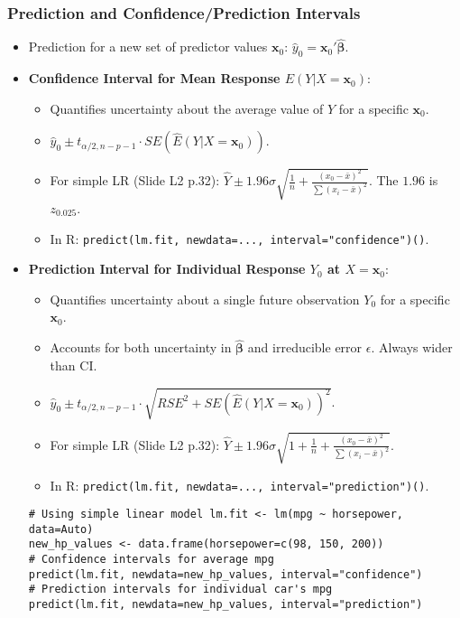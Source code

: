 \documentclass[12pt,a4paper]{article}
\newcommand{\Rfunction}[1]{\texttt{#1()}} %
\begin{document}
\begin{itemize}
    \subsubsection{Prediction and Confidence/Prediction Intervals }
        \begin{itemize}
            \item Prediction for a new set of predictor values $\mathbf{x}_0$: $\hat{y}_0 = \mathbf{x}_0'\hat{\boldsymbol{\beta}}$.
            \item \textbf{Confidence Interval for Mean Response $E(Y|X=\mathbf{x}_0)$}:
                \begin{itemize}
                    \item Quantifies uncertainty about the average value of $Y$ for a specific $\mathbf{x}_0$.
                    \item $\hat{y}_0 \pm t_{\alpha/2, n-p-1} \cdot SE(\hat{E}(Y|X=\mathbf{x}_0))$.
                    \item For simple LR (Slide L2 p.32): $\hat{Y} \pm 1.96\hat{\sigma} \sqrt{\frac{1}{n} + \frac{(x_0 - \bar{x})^2}{\sum(x_i - \bar{x})^2}}$. The $1.96$ is $z_{0.025}$.
                    \item In R: \Rfunction{predict(lm.fit, newdata=..., interval="confidence")}.
                \end{itemize}
            \item \textbf{Prediction Interval for Individual Response $Y_0$ at $X=\mathbf{x}_0$}:
                \begin{itemize}
                    \item Quantifies uncertainty about a single future observation $Y_0$ for a specific $\mathbf{x}_0$.
                    \item Accounts for both uncertainty in $\hat{\boldsymbol{\beta}}$ and irreducible error $\epsilon$. Always wider than CI.
                    \item $\hat{y}_0 \pm t_{\alpha/2, n-p-1} \cdot \sqrt{RSE^2 + SE(\hat{E}(Y|X=\mathbf{x}_0))^2}$.
                    \item For simple LR (Slide L2 p.32): $\hat{Y} \pm 1.96\hat{\sigma} \sqrt{1 + \frac{1}{n} + \frac{(x_0 - \bar{x})^2}{\sum(x_i - \bar{x})^2}}$.
                    \item In R: \Rfunction{predict(lm.fit, newdata=..., interval="prediction")}.
                \end{itemize}
\begin{lstlisting}[caption={Confidence and Prediction Intervals in R}]
# Using simple linear model lm.fit <- lm(mpg ~ horsepower, data=Auto)
new_hp_values <- data.frame(horsepower=c(98, 150, 200))
# Confidence intervals for average mpg
predict(lm.fit, newdata=new_hp_values, interval="confidence")
# Prediction intervals for individual car's mpg
predict(lm.fit, newdata=new_hp_values, interval="prediction")
\end{lstlisting}
        \end{itemize}


\end{itemize}
\end{document}
